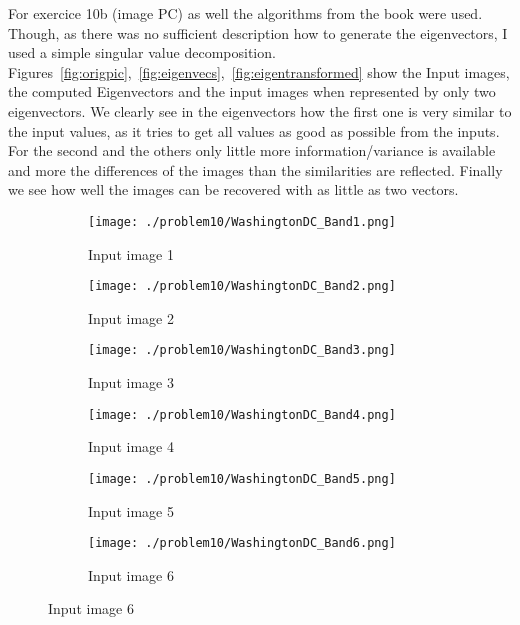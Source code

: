 \documentclass[a4paper]{scrartcl}
\begin{document}
For exercice 10b (image PC) as well the algorithms from the book were used. Though, as there was no sufficient description how to generate the eigenvectors, I used a simple singular value decomposition. Figures~\ref{fig:origpic},~\ref{fig:eigenvecs},~\ref{fig:eigentransformed} show the Input images, the computed Eigenvectors and the input images when represented by only two eigenvectors.
We clearly see in the eigenvectors how the first one is very similar to the input values, as it tries to get all values as good as possible from the inputs. For the second and the others only little more information/variance is available and more the differences of the images than the similarities are reflected.
Finally we see how well the images can be recovered with as little as two vectors.


\begin{figure}[H]
  \centering
  \caption{Principal components input images }
  \label{fig:origpic}
  \begin{subfigure}[t]{0.3\textwidth}
    \texttt{[image: ./problem10/WashingtonDC\_Band1.png]}
    \caption{Input image 1}
  \end{subfigure}
  \begin{subfigure}[t]{0.3\textwidth}
    \texttt{[image: ./problem10/WashingtonDC\_Band2.png]}
    \caption{Input image 2}
  \end{subfigure}
  \begin{subfigure}[t]{0.3\textwidth}
    \texttt{[image: ./problem10/WashingtonDC\_Band3.png]}
    \caption{Input image 3}
  \end{subfigure}
  \begin{subfigure}[t]{0.3\textwidth}
    \texttt{[image: ./problem10/WashingtonDC\_Band4.png]}
    \caption{Input image 4}
  \end{subfigure}
  \begin{subfigure}[t]{0.3\textwidth}
    \texttt{[image: ./problem10/WashingtonDC\_Band5.png]}
    \caption{Input image 5}
  \end{subfigure}
  \begin{subfigure}[t]{0.3\textwidth}
    \texttt{[image: ./problem10/WashingtonDC\_Band6.png]}
    \caption{Input image 6}
  \end{subfigure}
\end{figure}
\end{document}
